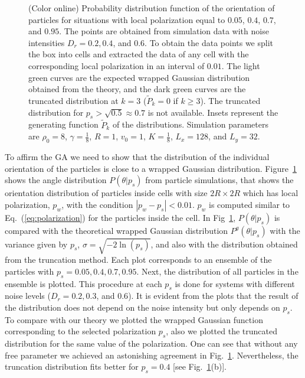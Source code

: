 \documentclass[reprint,floatfix,amsmath,amssymb,aps,pre,showkeys,showpacs,superscriptaddress]{revtex4-1}
\newcommand{\p}{p}
\newcommand{\hl}[1]{\textcolor{hlcolor}{#1}}
\newcommand{\req}[1]{Eq.~(\ref{#1})}
\begin{document}
\begin{figure}
\caption{(Color online) Probability distribution function of the orientation of particles for  situations with local polarization equal to  $0.05$,  $0.4$,  $0.7$, and  $0.95$. The points are obtained from simulation data with noise intensities $D_r=0.2,0.4$, and $0.6$. To obtain the data points we split the box into cells and extracted the data of any cell with the corresponding local polarization in an interval of $0.01$. The light green curves are the expected wrapped Gaussian distribution obtained from the theory, and the dark green curves are the truncated distribution at $k=3$ ($\tilde{P}_k = 0$ if $k \ge 3$). The truncated distribution for $p_s > \sqrt{0.5} \approx 0.7$ is not available. Insets represent the generating function $\tilde{P}_k$ of the distributions. Simulation parameters are $\rho_0=8$, $\gamma = \frac{1}{8}$, $R=1$, $v_0=1$, $K=\frac{1}{8}$, $L_x=128$, and $L_y=32$.}
	\label{fig:f-alignment-distribution}
\end{figure}

To affirm the GA we need to show that the distribution of the individual orientation of the particles is close to a wrapped Gaussian distribution. Figure~\ref{fig:f-alignment-distribution} \hl{shows} the angle distribution $P(\theta|\p_s)$ from particle simulations\hl{, that shows the orientation distribution of particles inside cells with size $2R\times 2R$ which has local polarization, $\p_w$, with the condition $|\p_w - \p_s| < 0.01$. $\p_w$ is computed similar to \req{eq:polarization} for the particles inside the cell. In Fig~\ref{fig:f-alignment-distribution}, $P(\theta|\p_s)$ is compared} with the theoretical wrapped Gaussian distribution $P^g(\theta|\p_s)$ with \hl{the} variance given by $\p_s$, $\sigma= \sqrt{-2 \ln(\p_s)}$, and also with the distribution obtained from the truncation method. Each plot corresponds to an ensemble of the particles with $\p_s=0.05,0.4,0.7,0.95$. Next, the distribution of all particles in the ensemble is plotted. This procedure at each $\p_s$ is done for systems with different noise levels ($D_r=0.2,0.3$, and $0.6$). It is evident from the plots that the result of the distribution does not depend on the noise intensity but only depends on $\p_s$. To compare with \hl{our} theory we plotted the wrapped Gaussian function corresponding to the selected polarization $\p_s$, also we plotted the truncated distribution for the same value of \hl{the} polarization. One can see that without any free parameter we achieved an astonishing agreement in Fig.~\ref{fig:f-alignment-distribution}. Nevertheless, the truncation distribution fits better \hl{for} $\p_s=0.4$ [see Fig.~\ref{fig:f-alignment-distribution}(b)].
\end{document}
